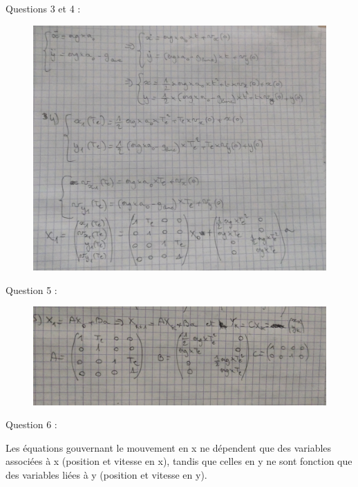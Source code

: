 \documentclass[14pt]{extarticle}
\begin{document}
Questions 3 et 4 :
\begin{figure}[tbh]
    \vspace{0.1cm}
        \centering
        \includegraphics[width=\columnwidth]{"images/q3_q4.jpg"}
    
    \end{figure}





\break 
Question 5 : 

\begin{figure}[tbh]
    \vspace{0.1cm}
        \centering
        \includegraphics[width=\columnwidth]{"images/q5.jpg"}
    
    \end{figure}

\vspace{0.5cm}

Question 6 :

    Les équations gouvernant le mouvement en x ne dépendent que des variables associées à x (position et vitesse en x), tandis que celles en y ne sont fonction que des variables liées à y (position et vitesse en y).
\end{document}
